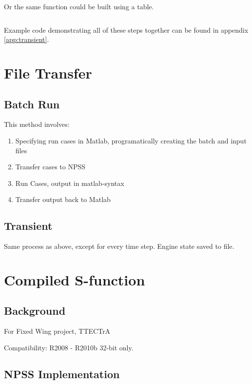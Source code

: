 \documentclass[heading.tex]{subfiles}
\begin{document}
\begin{adjustwidth}{-1cm}{-1cm}
 \inputminted[]{c++}{code/rampFn}
 \end{adjustwidth} 
 
Or the same function could be built using a table. 
 
 \begin{adjustwidth}{-1cm}{-1cm}
 \inputminted[]{c++}{code/rampTb}
 \end{adjustwidth} 

Example code demonstrating all of these steps together can be found in appendix \cref{app:transient}.

\section{File Transfer}
\subsection{Batch Run}
This method involves:

\begin{enumerate}
  \item Specifying run cases in Matlab, programatically creating the batch and input files
  \item Transfer cases to NPSS
  \item Run Cases, output in matlab-syntax
  \item Transfer output back to Matlab
\end{enumerate}

\subsection{Transient}

Same process as above, except for every time step. Engine state saved to file.

\section{Compiled S-function}
\subsection{Background}
For Fixed Wing project, TTECTrA

Compatibility: R2008 - R2010b 32-bit only.

\subsection{NPSS Implementation}
\end{document}
